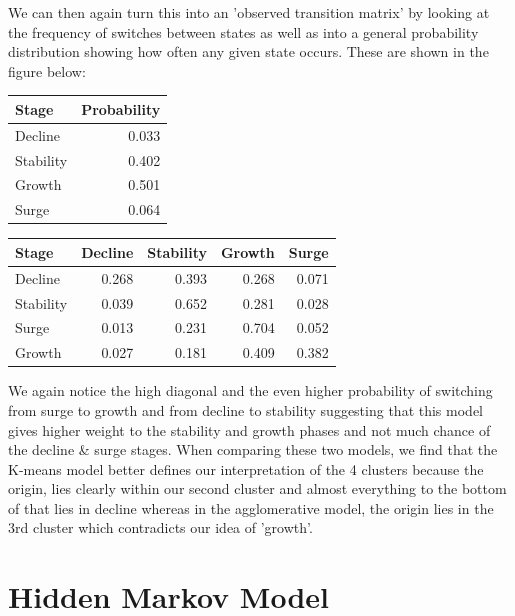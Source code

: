 \documentclass[12pt]{article}
\begin{document}
\FloatBarrier
We can then again turn this into an 'observed transition matrix' by looking at the frequency of switches between states as well as into a general probability distribution showing how often any given state occurs. These are shown in the figure below:
\begin{center}
\begin{tabular}{lr}
\toprule
Stage  & Probability \\
\midrule
Decline &  0.033 \\
Stability &  0.402 \\
Growth &  0.501 \\
Surge &  0.064 \\
\bottomrule
\end{tabular}
\quad
\begin{tabular}{lrrrr}
\toprule
Stage & Decline &  Stability & Growth & Surge \\
\midrule
Decline   &  0.268 &  0.393 &  0.268 &  0.071 \\
Stability     &  0.039 &  0.652 &  0.281 &  0.028 \\
Surge     &  0.013 &  0.231 &  0.704 &  0.052 \\
Growth     &  0.027 &  0.181 &  0.409 &  0.382 \\
\bottomrule
\end{tabular}
\end{center}
\vspace{0.5cm}
We again notice the high diagonal and the even higher probability of switching from surge to growth and from decline to stability suggesting that this model gives higher weight to the stability and growth phases and not much chance of the decline \& surge stages.
When comparing these two models, we find that the K-means model better defines our interpretation of the 4 clusters because the origin, lies clearly within our second cluster and almost everything to the bottom of that lies in decline whereas in the agglomerative model, the origin lies in the 3rd cluster which contradicts our idea of 'growth'.
\newpage
\section{Hidden Markov Model}
\end{document}
